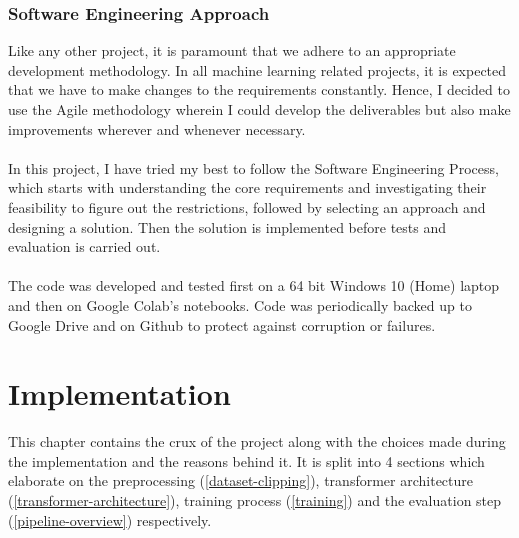 \documentclass[12pt,a4paper,twoside,openright]{report}
\begin{document}
\subsection{Software Engineering Approach}
\label{professional-approach}

Like any other project, it is paramount that we adhere to an appropriate development methodology. In all machine learning related projects, it is expected that we have to make changes to the requirements constantly. Hence, I decided to use the Agile methodology wherein I could develop the deliverables but also make improvements wherever and whenever necessary.
\\\\
In this project, I have tried my best to follow the Software Engineering Process, which starts with understanding the core requirements and investigating their feasibility to figure out the restrictions, followed by selecting an approach and designing a solution. Then the solution is implemented before tests and evaluation is carried out.
\\\\
The code was developed and tested first on a 64 bit Windows 10 (Home) laptop and then on Google Colab's notebooks. Code was periodically backed up to Google Drive and on Github to protect against corruption or failures.



\chapter{Implementation}
\label{implementation}
This chapter contains the crux of the project along with the choices made during the implementation and the reasons behind it. It is split into 4 sections which elaborate on the preprocessing (\ref{dataset-clipping}), transformer architecture (\ref{transformer-architecture}), training process (\ref{training}) and the evaluation step (\ref{pipeline-overview}) respectively.
\end{document}
